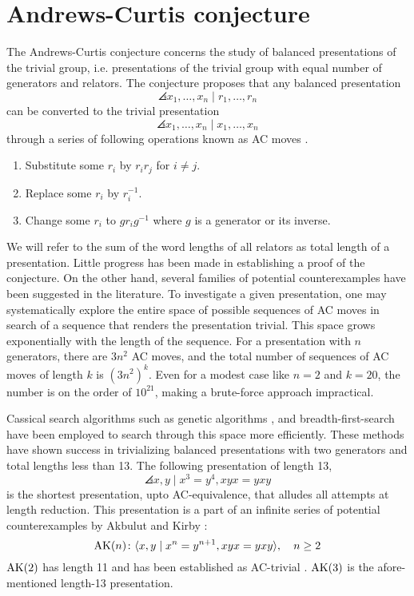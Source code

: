 
\section{Andrews-Curtis conjecture\label{sec:AC}}

The Andrews-Curtis conjecture concerns the study of balanced presentations of the trivial group, i.e. presentations of the trivial group with equal number of generators and relators. The conjecture proposes that any balanced presentation 
\[
\angles{x_1, \dots, x_n \mid r_1, \dots, r_n}
\]
can be converted to the trivial presentation
\[
\angles{x_1, \dots, x_n \mid x_1, \dots, x_n}
\]
through a series of following operations known as AC moves \cite{Andrews-Curtis}.
\begin{enumerate}[label=(AC\arabic*)]
	\item Substitute some $r_i$ by $r_i r_j$ for $i \neq j$.
	\item Replace some $r_i$ by $r_i^{-1}$.
	\item Change some $r_i$ to $g r_i g^{-1}$ where $g$ is a generator or its inverse.
\end{enumerate}

We will refer to the sum of the word lengths of all relators as total length of a presentation. Little progress has been made in establishing a proof of the conjecture. On the other hand, several families of potential counterexamples have been suggested in the literature. To investigate a given presentation, one may systematically explore the entire space of possible sequences of AC moves in search of a sequence that renders the presentation trivial. This space grows exponentially with the length of the sequence. For a presentation with $n$ generators, there are $3n^2$ AC moves, and the total number of sequences of AC moves of length $k$ is $(3n^2)^k$. Even for a modest case like $n=2$ and $k=20$, the number is on the order of $10^{21}$, making a brute-force approach impractical.
\newline 

Cassical search algorithms such as genetic algorithms \cite{genetic}, and breadth-first-search  \cite{bfs-ac} have been employed to search through this space more efficiently. These methods have shown success in trivializing balanced presentations with two generators and total lengths less than 13. The following presentation of length 13,
\[
\angles{x, y \mid x^3 = y^4, xyx = yxy}
\]
is the shortest presentation, upto AC-equivalence, that alludes all attempts at length reduction. This presentation is a part of an infinite series of potential counterexamples by Akbulut and Kirby \cite{Akbulut-Kirby}:
\[
\text{AK}(n) \colon \langle x, y \mid x^n = y^{n+1}, xyx = yxy\rangle, \quad n \geq 2
\]
$\text{AK}(2)$ has length 11 and has been established as AC-trivial  \cite{genetic}. $\text{AK}(3)$ is the afore-mentioned length-13 presentation. 
\newline

